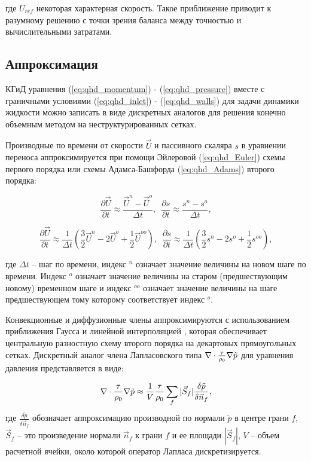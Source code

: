 \noindent где $U_{ref}$ некоторая характерная скорость. Такое приближение приводит к разумному решению с точки зрения баланса между точностью и вычислительными затратами.

\subsection{Аппроксимация}

КГиД уравнения (\ref{eq:qhd_momentum}) - (\ref{eq:qhd_pressure}) вместе с граничными условиями (\ref{eq:qhd_inlet}) - (\ref{eq:qhd_walls}) для задачи динамики жидкости можно записать в виде дискретных аналогов для решения конечно объемным методом на неструктурированных сетках.

Производные по времени от скорости $\vec U$ и пассивного скаляра $s$ в уравнении переноса аппроксимируется при помощи Эйлеровой (\ref{eq:qhd_Euler}) схемы первого порядка или схемы Адамса-Башфорда (\ref{eq:qhd_Adams}) второго порядка:

\begin{equation}\label{eq:qhd_Euler}
    \frac{\partial \vec{U}}{\partial t} \approx \frac{ \vec{U}^n-\vec{U}^o}{\Delta t}, \,\,\, 
    \frac{\partial s}{\partial t} \approx \frac{ s^n-s^o}{\Delta t},
\end{equation}

\begin{equation}\label{eq:qhd_Adams}
    \frac{\partial \vec{U}}{\partial t} \approx \frac{1}{\Delta t} \left  (\frac{3}{2}\vec{U}^n - 2\vec{U}^o + \frac{1}{2} \vec{U}^{oo} \right), \,\,\,
    \frac{\partial s}{\partial t} \approx \frac{1}{\Delta t} \left (\frac{3}{2}{s}^n - 2{s}^o + \frac{1}{2} {s}^{oo}\right),
\end{equation}

где $\Delta t$ -- шаг по времени, индекс $^n$ означает значение величины на новом шаге по времени. Индекс $^o$ означает значение величины на старом (предшествующим новому) временном шаге и индекс $^{oo}$ означает значение величины на шаге предшествующем тому которому соответствует индекс $^o$. 

Конвекционные и диффузионные члены аппроксимируются с использованием приближения Гаусса и линейной интерполяцией \cite{PericCFDLecture,FerzigerPeric}, которая обеспечивает центральную разностную схему второго порядка на декартовых прямоугольных сетках. Дискретный аналог члена Лапласовского типа $\nabla \cdot \frac{\tau}{\rho_0}\nabla \Tilde{p}$ для уравнения давления представляется в виде:


\begin{equation}
    \nabla \cdot \frac{\tau}{\rho_0}\nabla \Tilde{p} \approx 
    \frac{1}{V} \frac{\tau}{\rho_0} \sum_f |\vec{S}_f|
    \frac{\delta \tilde p }{\delta \vec{n}_f} ,
\end{equation}
где $\frac{\delta \tilde p }{\delta \vec{n}_f}$ обозначает аппроксимацию производной по нормали $\tilde p$ в центре грани $f$, $\vec S_f$ -- это произведение нормали $\vec n_f$ к грани $f$ и ее площади $|\vec S_f|$, $V$ -- объем расчетной ячейки, около которой оператор Лапласа дискретизируется.

